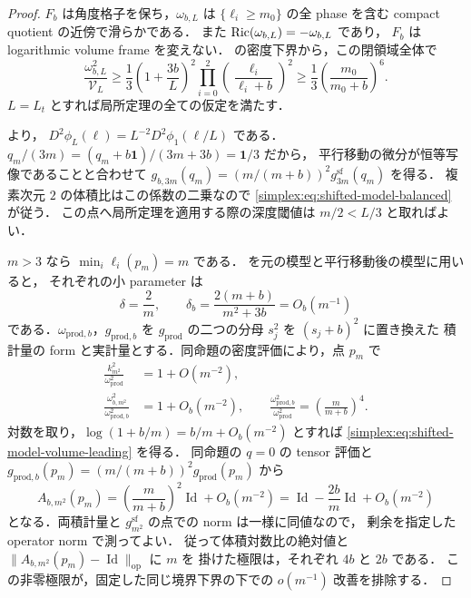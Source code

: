 \begin{proof}
$F_b$ は角度格子を保ち，$\omega_{b,L}$ は
$\{\ell_i\ge m_0\}$ の全 phase を含む compact quotient の近傍で滑らかである．
また $\operatorname{Ric}(\omega_{b,L})=-\omega_{b,L}$ であり，
$F_b$ は logarithmic volume frame を変えない．
 の密度下界から，この閉領域全体で
\[
 \frac{\omega_{b,L}^2}{\mathcal V_L}
 \ge\frac13\left(1+\frac{3b}{L}\right)^2
        \prod_{i=0}^2\left(\frac{\ell_i}{\ell_i+b}\right)^2
 \ge\frac13\left(\frac{m_0}{m_0+b}\right)^6 .
\]
$L=L_t$ とすれば局所定理の全ての仮定を満たす．

 より，
$D^2\phi_L(\ell)=L^{-2}D^2\phi_1(\ell/L)$ である．
$q_m/(3m)=(q_m+b\mathbf1)/(3m+3b)=\mathbf1/3$ だから，
平行移動の微分が恒等写像であることと合わせて
$g_{b,3m}(q_m)=(m/(m+b))^2g_{3m}^{\mathrm{sf}}(q_m)$ を得る．
複素次元 $2$ の体積比はこの係数の二乗なので
\eqref{simplex:eq:shifted-model-balanced} が従う．
この点へ局所定理を適用する際の深度閾値は $m/2<L/3$ と取ればよい．

$m>3$ なら $\min_i\ell_i(p_m)=m$ である．
 を元の模型と平行移動後の模型に用いると，
それぞれの小 parameter は
\[
 \delta=\frac{2}{m},\qquad
 \delta_b=\frac{2(m+b)}{m^2+3b}=O_b(m^{-1})
\]
である．$\omega_{\mathrm{prod},b}$，$g_{\mathrm{prod},b}$ を
$g_{\mathrm{prod}}$ の二つの分母 $s_j^2$ を $(s_j+b)^2$ に置き換えた
積計量の form と実計量とする．同命題の密度評価により，点 $p_m$ で
\[
 \begin{aligned}
  \frac{k_{m^2}^2}{\omega_{\mathrm{prod}}^2}&=1+O(m^{-2}),\\
  \frac{\omega_{b,m^2}^2}{\omega_{\mathrm{prod},b}^2}&=1+O_b(m^{-2}),
  \qquad
  \frac{\omega_{\mathrm{prod},b}^2}{\omega_{\mathrm{prod}}^2}
        =\left(\frac{m}{m+b}\right)^4 .
 \end{aligned}
\]
対数を取り，$\log(1+b/m)=b/m+O_b(m^{-2})$ とすれば
\eqref{simplex:eq:shifted-model-volume-leading} を得る．
同命題の $q=0$ の tensor 評価と
$g_{\mathrm{prod},b}(p_m)=(m/(m+b))^2g_{\mathrm{prod}}(p_m)$ から
\[
 A_{b,m^2}(p_m)=\left(\frac{m}{m+b}\right)^2\operatorname{Id}+O_b(m^{-2})
     =\operatorname{Id}-\frac{2b}{m}\operatorname{Id}+O_b(m^{-2})
\]
となる．両積計量と $g_{m^2}^{\mathrm{sf}}$ の点での norm は一様に同値なので，
剰余を指定した operator norm で測ってよい．
従って体積対数比の絶対値と
$\|A_{b,m^2}(p_m)-\operatorname{Id}\|_{\mathrm{op}}$ に $m$ を
掛けた極限は，それぞれ $4b$ と $2b$ である．
この非零極限が，固定した同じ境界下界の下での $o(m^{-1})$ 改善を排除する．
\end{proof}

